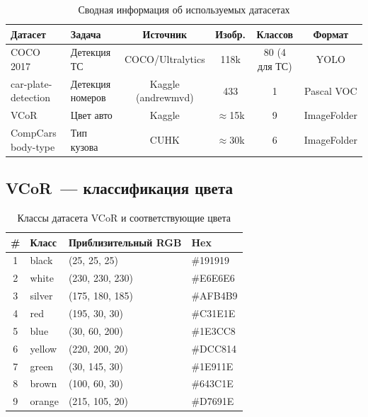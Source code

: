 \documentclass[14pt,a4paper]{report}
\numberwithin{equation}{chapter}
\numberwithin{figure}{chapter}
\numberwithin{table}{chapter}
\begin{document}
\begin{table}[H]
\centering
\caption{Сводная информация об используемых датасетах}
\label{tab:datasets_summary}
\begin{tabularx}{\textwidth}{lXcccc}
\toprule
\textbf{Датасет} & \textbf{Задача} & \textbf{Источник} & \textbf{Изобр.} & \textbf{Классов} & \textbf{Формат} \\
\midrule
COCO 2017          & Детекция ТС        & COCO/Ultralytics & 118k & 80 (4 для ТС) & YOLO \\
car-plate-detection & Детекция номеров   & Kaggle (andrewmvd) & 433 & 1 & Pascal VOC \\
VCoR               & Цвет авто          & Kaggle           & $\approx$15k & 9 & ImageFolder \\
CompCars body-type & Тип кузова         & CUHK             & $\approx$30k & 6 & ImageFolder \\
\bottomrule
\end{tabularx}
\end{table}

\subsection{VCoR~--- классификация цвета}

\begin{table}[H]
\centering
\caption{Классы датасета VCoR и соответствующие цвета}
\label{tab:vcor}
\begin{tabular}{clll}
\toprule
\textbf{\#} & \textbf{Класс} & \textbf{Приблизительный RGB} & \textbf{Hex} \\
\midrule
1 & black  & (25, 25, 25)   & \#191919 \\
2 & white  & (230, 230, 230)& \#E6E6E6 \\
3 & silver & (175, 180, 185)& \#AFB4B9 \\
4 & red    & (195, 30, 30)  & \#C31E1E \\
5 & blue   & (30, 60, 200)  & \#1E3CC8 \\
6 & yellow & (220, 200, 20) & \#DCC814 \\
7 & green  & (30, 145, 30)  & \#1E911E \\
8 & brown  & (100, 60, 30)  & \#643C1E \\
9 & orange & (215, 105, 20) & \#D7691E \\
\bottomrule
\end{tabular}
\end{table}
\end{document}

